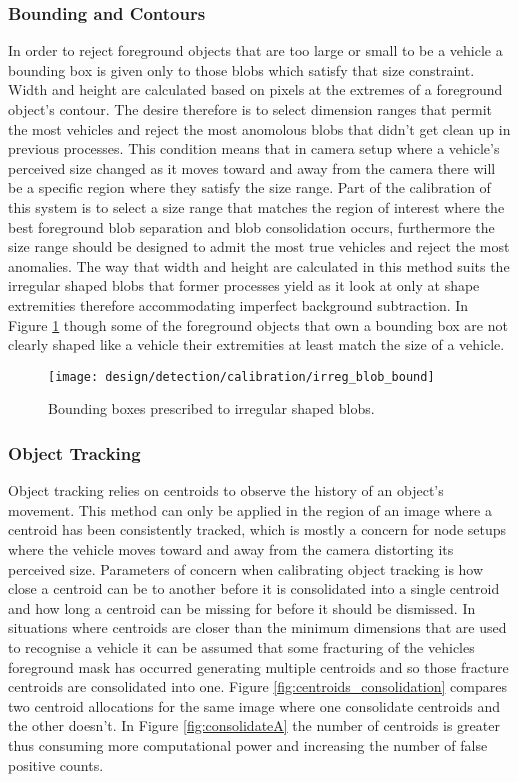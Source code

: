 \subsubsection{Bounding and Contours}


In order to reject foreground objects that are too large or small to be a vehicle a bounding box is given only to those blobs which satisfy that size constraint. Width and height are calculated based on pixels at the extremes of a foreground object's contour. The desire therefore is to select dimension ranges that permit the most vehicles and reject the most anomolous blobs that didn't get clean up in previous processes. This condition means that in camera setup where a vehicle's perceived size changed as it moves toward and away from the camera there will be a specific region where they satisfy the size range. Part of the calibration of this system is to select a size range that matches the region of interest where the best foreground blob separation and blob consolidation occurs, furthermore the size range should be designed to admit the most true vehicles and reject the most anomalies. The way that width and height are calculated in this method suits the irregular shaped blobs that former processes yield as it look at only at shape extremities therefore accommodating imperfect background subtraction. In Figure \ref{fig:irreg_blob} though some of the foreground objects that own a bounding box are not clearly shaped like a vehicle their extremities at least match the size of a vehicle.


\begin{figure}[H]
    \centering
    \centering\texttt{[image: design/detection/calibration/irreg\_blob\_bound]}
    \caption{Bounding boxes prescribed to irregular shaped blobs.}
    \label{fig:irreg_blob}
  \end{figure}

  \subsubsection{Object Tracking}

  Object tracking relies on centroids to observe the history of an object's movement. This method can only be applied in the region of an image where a centroid has been consistently tracked, which is mostly a concern for node setups where the vehicle moves toward and away from the camera distorting its perceived size. Parameters of concern when calibrating object tracking is how close a centroid can be to another before it is consolidated into a single centroid and how long a centroid can be missing for before it should be dismissed. In situations where centroids are closer than the minimum dimensions that are used to recognise a vehicle it can be assumed that some fracturing of the vehicles foreground mask has occurred generating multiple centroids and so those fracture centroids are consolidated into one. Figure \ref{fig:centroids_consolidation} compares two centroid allocations for the same image where one consolidate centroids and the other doesn't. In Figure \ref{fig:consolidateA} the number of centroids is greater thus consuming more computational power and increasing the number of false positive counts. 

